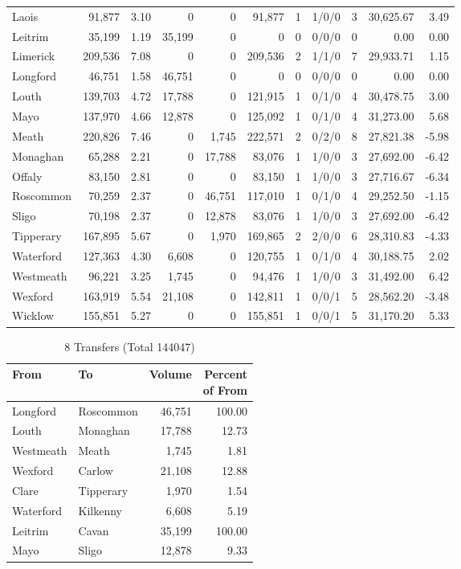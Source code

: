 \documentclass[a4paper]{article}
\begin{document}
\begin{longtable}{lrrrrrrlrrr}
Laois&91,877& 3.10&0&0&91,877&1&1/0/0&3&30,625.67& 3.49\\ 
Leitrim&35,199& 1.19&35,199&0&0&0&0/0/0&0& 0.00& 0.00\\ 
Limerick&209,536& 7.08&0&0&209,536&2&1/1/0&7&29,933.71& 1.15\\ 
Longford&46,751& 1.58&46,751&0&0&0&0/0/0&0& 0.00& 0.00\\ 
Louth&139,703& 4.72&17,788&0&121,915&1&0/1/0&4&30,478.75& 3.00\\ 
Mayo&137,970& 4.66&12,878&0&125,092&1&0/1/0&4&31,273.00& 5.68\\ 
Meath&220,826& 7.46&0&1,745&222,571&2&0/2/0&8&27,821.38&-5.98\\ 
Monaghan&65,288& 2.21&0&17,788&83,076&1&1/0/0&3&27,692.00&-6.42\\ 
Offaly&83,150& 2.81&0&0&83,150&1&1/0/0&3&27,716.67&-6.34\\ 
Roscommon&70,259& 2.37&0&46,751&117,010&1&0/1/0&4&29,252.50&-1.15\\ 
Sligo&70,198& 2.37&0&12,878&83,076&1&1/0/0&3&27,692.00&-6.42\\ 
Tipperary&167,895& 5.67&0&1,970&169,865&2&2/0/0&6&28,310.83&-4.33\\ 
Waterford&127,363& 4.30&6,608&0&120,755&1&0/1/0&4&30,188.75& 2.02\\ 
Westmeath&96,221& 3.25&1,745&0&94,476&1&1/0/0&3&31,492.00& 6.42\\ 
Wexford&163,919& 5.54&21,108&0&142,811&1&0/0/1&5&28,562.20&-3.48\\ 
Wicklow&155,851& 5.27&0&0&155,851&1&0/0/1&5&31,170.20& 5.33\\ 
\end{longtable}

\begin{table}[htbp]
\caption{8 Transfers (Total 144047)}
\centering
\begin{tabular}{llrr} \toprule
From &To &Volume &\shortstack{Percent\\of From} \\ \midrule
Longford&Roscommon&46,751&100.00\\ 
Louth&Monaghan&17,788&12.73\\ 
Westmeath&Meath&1,745& 1.81\\ 
Wexford&Carlow&21,108&12.88\\ 
Clare&Tipperary&1,970& 1.54\\ 
Waterford&Kilkenny&6,608& 5.19\\ 
Leitrim&Cavan&35,199&100.00\\ 
Mayo&Sligo&12,878& 9.33\\ 
\bottomrule
\end{tabular}
\end{table}
\end{document}
